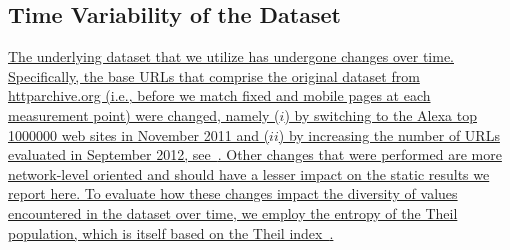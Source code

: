 \documentclass[onecolumn,12pt]{IEEEtran}
\begin{document}
\subsection{Time Variability of the Dataset}
\uline{The underlying dataset that we utilize has undergone changes over time. 
Specifically, the base URLs that comprise the original dataset from httparchive.org (i.e., before we match fixed and mobile pages at each measurement point) were changed, namely ($i$) by switching to the Alexa top 1000000 web sites in November 2011 and ($ii$) by increasing the number of URLs evaluated in September 2012, see~\cite{ht13}. Other changes that were performed are more network-level oriented and should have a lesser impact on the static results we report here.
To evaluate how these changes impact the diversity of values encountered in the dataset over time, we employ the entropy of the Theil population, which is itself based on the Theil index~\cite{Th72}.}
\end{document}
